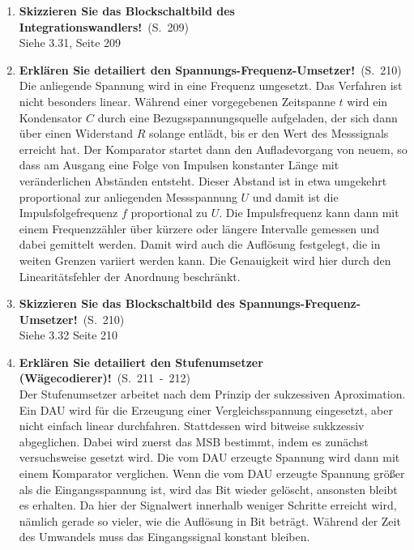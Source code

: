 \documentclass[a4paper,12pt]{article}
\newcommand{\statement}[3]{\pagebreak[3]\item {\textbf{#1!}}\ (S.\ #2)#3}
\newcommand{\normaltext}[1]{\\#1}
\newcommand{\page}[1]{#1}
\newcommand{\pages}[2]{#1\ -\ #2}
\begin{document}
\begin{enumerate}
  \statement{Skizzieren Sie das Blockschaltbild des Integrationswandlers}{\page{209}}
  {
    \normaltext{Siehe \index{Bild} 3.31, Seite 209}
  }

  \statement{Erklären Sie detailiert den Spannungs-Frequenz-Umsetzer}{\page{210}}
  {
    \normaltext{Die anliegende Spannung wird in eine Frequenz umgesetzt. Das Verfahren ist
                nicht besonders linear. Während einer vorgegebenen Zeitspanne $t$ wird
                ein Kondensator $C$ durch eine Bezugsspannungsquelle aufgeladen, der sich
                dann über einen Widerstand $R$ solange entlädt, bis er den Wert des Messsignals
                erreicht hat. Der Komparator startet dann den Aufladevorgang von neuem, so dass
                am Ausgang eine Folge von Impulsen konstanter Länge mit veränderlichen Abständen
                entsteht. Dieser Abstand ist in etwa umgekehrt proportional zur anliegenden
                Messspannung $U$ und damit ist die Impulsfolgefrequenz $f$ proportional zu $U$.
                Die Impulsfrequenz kann dann mit einem Frequenzzähler über kürzere oder
                längere Intervalle gemessen und dabei gemittelt werden. Damit wird auch die
                Auflösung festgelegt, die in weiten Grenzen variiert werden kann. Die Genauigkeit
                wird hier durch den Linearitätsfehler der Anordnung beschränkt.}
  }

  \statement{Skizzieren Sie das Blockschaltbild des Spannungs-Frequenz-Umsetzer} {\page{210}}
  {
    \normaltext{Siehe \index{Bild} 3.32 Seite 210}
  }

  \statement{Erklären Sie detailiert den Stufenumsetzer (Wägecodierer)}{\pages{211}{212}}
  {
    \normaltext{Der Stufenumsetzer arbeitet nach dem Prinzip der sukzessiven Aproximation. Ein DAU
                wird für die Erzeugung einer Vergleichsspannung eingesetzt, aber nicht einfach linear
                durchfahren. Stattdessen wird bitweise sukkzessiv abgeglichen. Dabei wird zuerst das
                MSB bestimmt, indem es zunächst versuchsweise gesetzt wird. Die vom DAU erzeugte
                Spannung wird dann mit einem Komparator verglichen. Wenn die vom DAU erzeugte Spannung
                größer als die Eingangsspannung ist, wird das Bit wieder gelöscht, ansonsten bleibt
                es erhalten. Da hier der Signalwert innerhalb weniger Schritte erreicht wird, nämlich
                gerade so vieler, wie die Auflösung in Bit beträgt. Während der Zeit des Umwandels muss das
                Eingangssignal konstant bleiben.}
  }


\end{enumerate}
\end{document}
